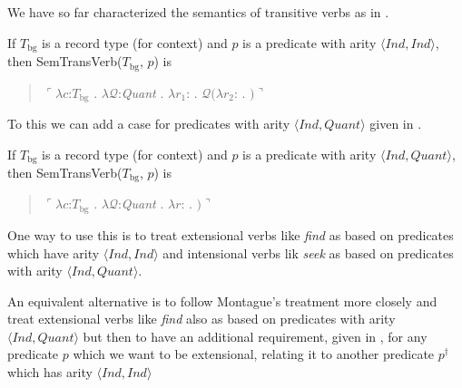 We have so far characterized the semantics of transitive verbs as in
\nexteg{}.
\begin{ex} 
        If $T_{\text{bg}}$ is a record type (for context) and $p$ is a
        predicate with arity $\langle\textit{Ind},\textit{Ind}\rangle$, then SemTransVerb($T_{\mathrm{bg}}$, $p$) is
        \begin{quote}
          $\ulcorner\lambda c$:$T_{\mathrm{bg}}$ . $\lambda
          \mathcal{Q}$:\textit{Quant} . $\lambda
          r_1$: . $\mathcal{Q}(\lambda r_2$:
          . $)\urcorner$
        \end{quote} 
\end{ex} 
To this we can add a case for predicates with arity
$\langle\textit{Ind},\textit{Quant}\rangle$ given in \nexteg{}.
\begin{ex} 
  If $T_{\text{bg}}$ is a record type (for context) and $p$ is a
  predicate with arity $\langle\textit{Ind},\textit{Quant}\rangle$, then SemTransVerb($T_{\mathrm{bg}}$, $p$) is
  \begin{quote}
    $\ulcorner\lambda c$:$T_{\mathrm{bg}}$ . $\lambda
    \mathcal{Q}$:\textit{Quant} . $\lambda
    r$: . $)\urcorner$
  \end{quote}  
\end{ex}
One way to use this is to treat extensional verbs like \textit{find}
as based on predicates which have arity
$\langle\textit{Ind},\textit{Ind}\rangle$ and intensional verbs lik
\textit{seek} as based on predicates with arity
$\langle\textit{Ind},\textit{Quant}\rangle$.

An equivalent alternative is to follow Montague's treatment more closely
and treat extensional verbs like \textit{find} also as based on
predicates with arity $\langle\textit{Ind},\textit{Quant}\rangle$
but then to have an additional requirement, given in \nexteg{}, for any predicate $p$
which we want to be extensional, relating it to another predicate
$p^{\dagger}$ which has arity $\langle\textit{Ind},\textit{Ind}\rangle$

  

 
